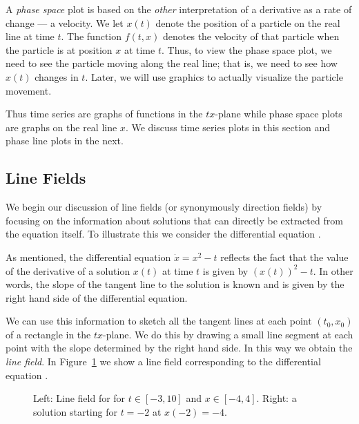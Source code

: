 \documentclass{ximera}
\begin{document}
A {\em phase space\/}  plot is based on
the {\em other\/} interpretation of a derivative as a rate of
change --- a velocity.  We let $x(t)$ denote the position of a
particle on the real line at time $t$.  The function $f(t,x)$
denotes the velocity of that particle when the particle is at
position $x$ at time $t$.  Thus, to view the phase space plot,
we need to see the particle moving along the real line; that is,
we need to see how $x(t)$ changes in $t$.  Later, we will use
\Matlab graphics to actually visualize the particle movement.

Thus time series are graphs of functions in the $tx$-plane while
phase space plots are graphs on the real line $x$.  We discuss
time series plots in this section and phase line plots in the
next.


\subsection*{Line Fields}

We begin our discussion of line fields  (or
synonymously direction fields)  by
focusing on the information about solutions that can directly
be extracted from the equation itself.  To illustrate this we
consider the differential equation .

As mentioned, the differential equation $\dot{x}=x^2-t$ reflects the fact 
that the value of the derivative of a solution $x(t)$ at time $t$ is
given by $(x(t))^2-t$.  In other words, the slope of the tangent
line to the solution is known and is given by the right hand
side of the differential equation.

We can use this information to sketch all the tangent lines at
each point $(t_0,x_0)$ of a rectangle in the $tx$-plane.  We do
this by drawing a small line segment at each point with the
slope determined by the right hand side.  In this way we obtain the
{\em line field}.  In Figure~\ref{df1_labelfig} we show a
line field corresponding to the differential equation .

\begin{figure}[htb]
        \centerline{%
	}
        \caption{Left: Line field for \protect{}
              for $t\in [-3,10]$ and $x\in [-4,4]$.
	      Right: a solution starting for $t=-2$ at $x(-2)=-4$.}
        \label{df1_labelfig}
\end{figure}
\end{document}
